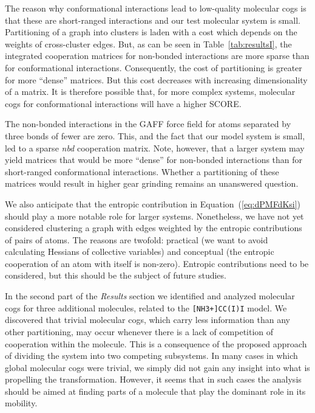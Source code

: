 The reason why conformational interactions lead to low-quality molecular cogs is that these are short-ranged interactions and our test molecular system is small.
Partitioning of a graph into clusters is laden with a cost which depends on the weights of cross-cluster edges.
But, as can be seen in Table~\ref{tab:resultsI}, the integrated cooperation matrices for non-bonded interactions are more sparse than for conformational interactions.
Consequently, the cost of partitioning is greater for more ``dense'' matrices.
But this cost decreases with increasing dimensionality of a matrix. 
It is therefore possible that, for more complex systems, molecular cogs for conformational interactions will have a higher SCORE.

The non-bonded interactions in the GAFF force field for atoms separated by three {\color{black}bonds of fewer} are zero.
This, and the fact that our model {\color{black}system} is small, led to a sparse \emph{nbd} cooperation matrix.
Note, however, that a larger system may yield matrices that would be more ``dense'' for non-bonded interactions than for short-ranged conformational interactions.
Whether a partitioning of these matrices would result in higher gear grinding remains an unanswered question.

We also anticipate that the entropic contribution in Equation~(\ref{eq:dPMFdKsi}) should play a more notable role for larger systems.
Nonetheless, we have not yet considered clustering a graph with edges weighted by the entropic contributions of pairs of atoms.
The reasons are twofold: practical (we want to avoid calculating Hessians of collective variables) and conceptual (the entropic cooperation of an atom with itself is non-zero).
Entropic contributions need to be considered, but this should be the subject of future studies.

{\color{black}
In the second part of the \emph{Results} section we identified and analyzed molecular cogs for three additional molecules, related to the \texttt{[NH3+]CC(I)I} model.
We discovered that trivial molecular cogs, which carry less information than any other partitioning, may occur whenever there is a lack of competition of cooperation within the molecule.
This is a consequence of the proposed approach of dividing the system into two competing subsystems.
In many cases in which global molecular cogs were trivial, we simply did not gain any insight into what is propelling the transformation.
However, it seems that in such cases the analysis should be aimed at finding parts of a molecule that play the dominant role in its mobility.
}

